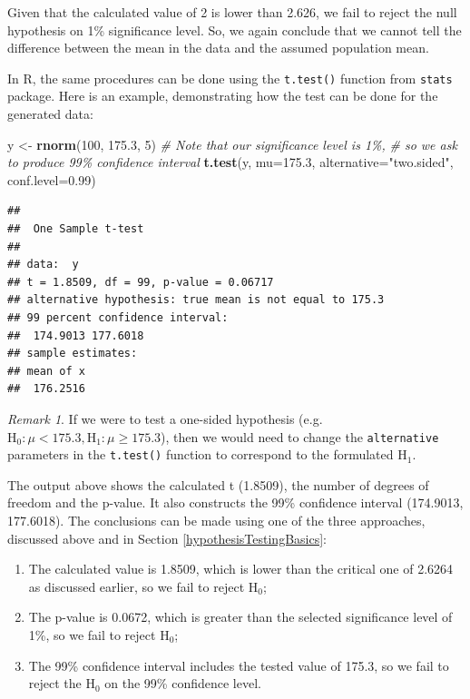 \documentclass[
]{book}
\newenvironment{Shaded}{\begin{snugshade}}{\end{snugshade}}
\newcommand{\AttributeTok}[1]{\textcolor[rgb]{0.13,0.29,0.53}{#1}}
\newcommand{\CommentTok}[1]{\textcolor[rgb]{0.56,0.35,0.01}{\textit{#1}}}
\newcommand{\DecValTok}[1]{\textcolor[rgb]{0.00,0.00,0.81}{#1}}
\newcommand{\FloatTok}[1]{\textcolor[rgb]{0.00,0.00,0.81}{#1}}
\newcommand{\FunctionTok}[1]{\textcolor[rgb]{0.13,0.29,0.53}{\textbf{#1}}}
\newcommand{\NormalTok}[1]{#1}
\newcommand{\OtherTok}[1]{\textcolor[rgb]{0.56,0.35,0.01}{#1}}
\newcommand{\StringTok}[1]{\textcolor[rgb]{0.31,0.60,0.02}{#1}}
\providecommand{\tightlist}{%
  \setlength{\itemsep}{0pt}\setlength{\parskip}{0pt}}
\theoremstyle{definition}
\theoremstyle{definition}
\theoremstyle{definition}
\theoremstyle{definition}
\theoremstyle{remark}
\newtheorem*{remark}{Remark}
\begin{document}
Given that the calculated value of 2 is lower than 2.626, we fail to reject the null hypothesis on 1\% significance level. So, we again conclude that we cannot tell the difference between the mean in the data and the assumed population mean.

In R, the same procedures can be done using the \texttt{t.test()} function from \texttt{stats} package. Here is an example, demonstrating how the test can be done for the generated data:

\begin{Shaded}
\begin{Highlighting}[]
\NormalTok{y }\OtherTok{\textless{}{-}} \FunctionTok{rnorm}\NormalTok{(}\DecValTok{100}\NormalTok{, }\FloatTok{175.3}\NormalTok{, }\DecValTok{5}\NormalTok{)}
\CommentTok{\# Note that our significance level is 1\%,}
\CommentTok{\# so we ask to produce 99\% confidence interval}
\FunctionTok{t.test}\NormalTok{(y, }\AttributeTok{mu=}\FloatTok{175.3}\NormalTok{, }\AttributeTok{alternative=}\StringTok{"two.sided"}\NormalTok{, }\AttributeTok{conf.level=}\FloatTok{0.99}\NormalTok{)}
\end{Highlighting}
\end{Shaded}

\begin{verbatim}
## 
##  One Sample t-test
## 
## data:  y
## t = 1.8509, df = 99, p-value = 0.06717
## alternative hypothesis: true mean is not equal to 175.3
## 99 percent confidence interval:
##  174.9013 177.6018
## sample estimates:
## mean of x 
##  176.2516
\end{verbatim}

\begin{remark}
If we were to test a one-sided hypothesis (e.g.~\(\mathrm{H}_0: \mu < 175.3, \mathrm{H}_1: \mu \geq 175.3\)), then we would need to change the \texttt{alternative} parameters in the \texttt{t.test()} function to correspond to the formulated H\(_1\).
\end{remark}

The output above shows the calculated t (1.8509), the number of degrees of freedom and the p-value. It also constructs the 99\% confidence interval (174.9013, 177.6018). The conclusions can be made using one of the three approaches, discussed above and in Section \ref{hypothesisTestingBasics}:

\begin{enumerate}
\def\labelenumi{\arabic{enumi}.}
\tightlist
\item
  The calculated value is 1.8509, which is lower than the critical one of 2.6264 as discussed earlier, so we fail to reject H\(_0\);
\item
  The p-value is 0.0672, which is greater than the selected significance level of 1\%, so we fail to reject H\(_0\);
\item
  The 99\% confidence interval includes the tested value of 175.3, so we fail to reject the H\(_0\) on the 99\% confidence level.
\end{enumerate}
\end{document}

